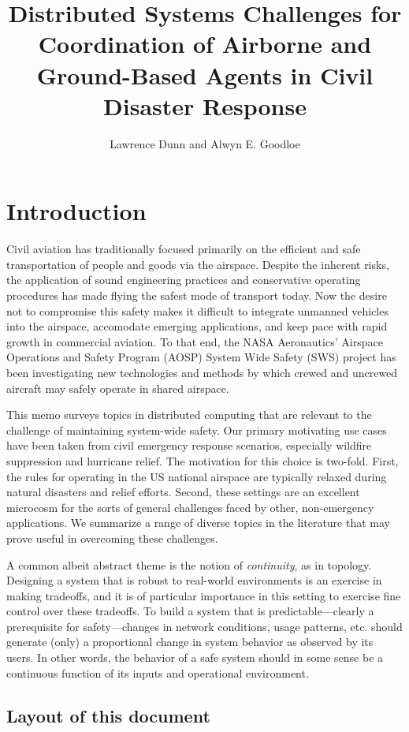 \documentclass[]             %
{NASA}                       %
\title{Distributed Systems Challenges for Coordination of Airborne and
Ground-Based Agents in Civil Disaster Response}
\author{Lawrence Dunn and Alwyn E. Goodloe}
\theoremstyle{definition}
\begin{document}
\newpage
\setcounter{tocdepth}{2}
\tableofcontents
\newpage

\hypertarget{introduction}{%
\section{Introduction}\label{introduction}}

Civil aviation has traditionally focused primarily on the efficient and
safe transportation of people and goods via the airspace. Despite the
inherent risks, the application of sound engineering practices and
conservative operating procedures has made flying the safest mode of
transport today. Now the desire not to compromise this safety makes it
difficult to integrate unmanned vehicles into the airspace, accomodate
emerging applications, and keep pace with rapid growth in commercial
aviation. To that end, the NASA Aeronautics' Airspace Operations and
Safety Program (AOSP) System Wide Safety (SWS) project has been
investigating new technologies and methods by which crewed and uncrewed
aircraft may safely operate in shared airspace.

This memo surveys topics in distributed computing that are relevant to
the \mbox{challenge} of maintaining system-wide safety. Our primary
motivating use cases have been taken from civil emergency response
scenarios, especially wildfire suppression and hurricane relief. The
motivation for this choice is two-fold. First, the rules for operating
in the US national airspace are typically relaxed during natural
disasters and relief efforts. Second, these settings are an excellent
microcosm for the sorts of general challenges faced by other,
non-emergency applications. We summarize a range of diverse topics in
the literature that may prove useful in overcoming these challenges.

A common albeit abstract theme is the notion of \emph{continuity}, as in
topology. Designing a system that is robust to real-world environments
is an exercise in making tradeoffs, and it is of particular importance
in this setting to exercise fine control over these tradeoffs. To build
a system that is predictable---clearly a prerequisite for
safety---changes in network conditions, usage patterns, etc. should
generate (only) a proportional change in system behavior as observed by
its users. In other words, the behavior of a safe system should in some
sense be a continuous function of its inputs and operational
environment.

\hypertarget{layout-of-this-document}{%
\subsection{Layout of this document}\label{layout-of-this-document}}
\end{document}
